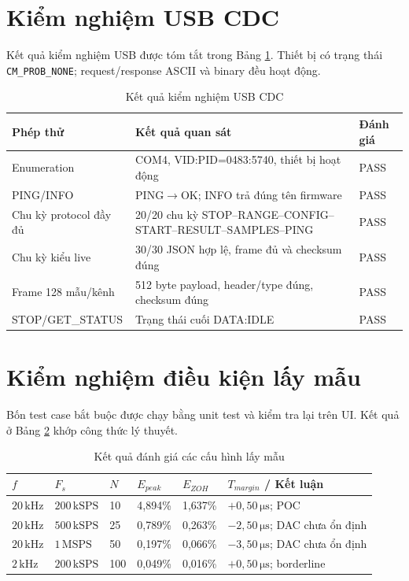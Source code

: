 \documentclass[12pt,a4paper]{report}
\newcommand{\code}[1]{\texttt{#1}}
\newcommand{\unit}[1]{\,\mathrm{#1}}
\newcommand{\tableheadcolor}{\rowcolor{gray!18}}
\begin{document}
\section{Kiểm nghiệm USB CDC}
Kết quả kiểm nghiệm USB được tóm tắt trong Bảng \ref{tab:usbtest}. Thiết bị có trạng thái \code{CM\_PROB\_NONE}; request/response ASCII và binary đều hoạt động.

\begin{table}[H]
\centering
\caption{Kết quả kiểm nghiệm USB CDC}
\label{tab:usbtest}
\begin{tabularx}{\textwidth}{|p{4.5cm}|X|p{1.9cm}|}
\hline
\tableheadcolor\textbf{Phép thử} & \textbf{Kết quả quan sát} & \textbf{Đánh giá} \\ \hline
Enumeration & COM4, VID:PID=0483:5740, thiết bị hoạt động & PASS \\ \hline
PING/INFO & PING$\rightarrow$OK; INFO trả đúng tên firmware & PASS \\ \hline
Chu kỳ protocol đầy đủ & 20/20 chu kỳ STOP--RANGE--CONFIG--START--RESULT--SAMPLES--PING & PASS \\ \hline
Chu kỳ kiểu live & 30/30 JSON hợp lệ, frame đủ và checksum đúng & PASS \\ \hline
Frame 128 mẫu/kênh & 512 byte payload, header/type đúng, checksum đúng & PASS \\ \hline
STOP/GET\_STATUS & Trạng thái cuối DATA:IDLE & PASS \\ \hline
\end{tabularx}
\end{table}

\section{Kiểm nghiệm điều kiện lấy mẫu}
Bốn test case bắt buộc được chạy bằng unit test và kiểm tra lại trên UI. Kết quả ở Bảng \ref{tab:samplingcases} khớp công thức lý thuyết.

\begin{table}[H]
\centering
\caption{Kết quả đánh giá các cấu hình lấy mẫu}
\label{tab:samplingcases}
\begin{tabularx}{\textwidth}{|p{1.8cm}|p{2cm}|p{0.8cm}|p{1.7cm}|p{1.7cm}|X|}
\hline
\tableheadcolor$f$ & $F_s$ & $N$ & $E_{peak}$ & $E_{ZOH}$ & $T_{margin}$ / Kết luận \\ \hline
$20\unit{kHz}$ & $200\unit{kSPS}$ & 10 & 4,894\% & 1,637\% & $+0,50\unit{\mu s}$; POC \\ \hline
$20\unit{kHz}$ & $500\unit{kSPS}$ & 25 & 0,789\% & 0,263\% & $-2,50\unit{\mu s}$; DAC chưa ổn định \\ \hline
$20\unit{kHz}$ & $1\unit{MSPS}$ & 50 & 0,197\% & 0,066\% & $-3,50\unit{\mu s}$; DAC chưa ổn định \\ \hline
$2\unit{kHz}$ & $200\unit{kSPS}$ & 100 & 0,049\% & 0,016\% & $+0,50\unit{\mu s}$; borderline \\ \hline
\end{tabularx}
\end{table}
\end{document}
